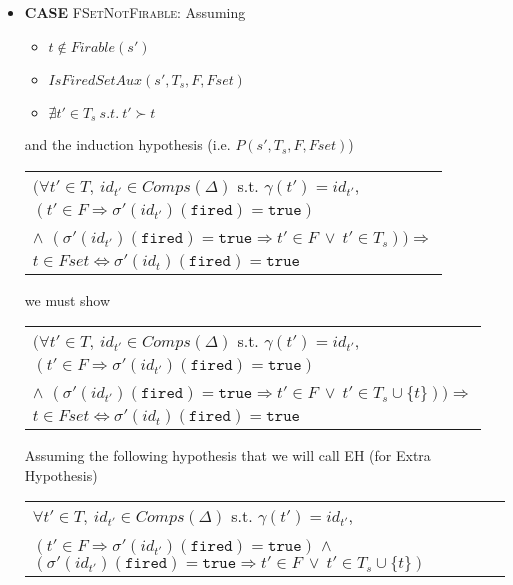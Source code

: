 \documentclass[dvipsnames,12pt]{article}
\begin{document}
\begin{niproof}
\begin{itemize}
  \item \textbf{CASE} \textsc{FSetNotFirable}:
    Assuming
    \begin{itemize}
    \item $t\notin{}Firable(s')$
    \item $IsFiredSetAux(s',T_s,F,Fset)$
    \item $\nexists{}t'\in{}T_s~s.t.~t'\succ{}t$
    \end{itemize}
    and the induction hypothesis (i.e. $P(s',T_s,F,Fset)$)
    \begin{ih}
      \begin{tabular}{l}
        $\big(\forall{}t'\in{}T,~id_{t'}\in{}Comps(\Delta)$
        s.t. $\gamma(t')=id_{t'}$,\\
        $(t'\in{}F\Rightarrow\sigma'(id_{t'})(\texttt{fired})=\mathtt{true})$\\
        $\land$
        $(\sigma'(id_{t'})(\texttt{fired})=\mathtt{true}\Rightarrow{}t'\in{}F~\lor~{}t'\in{}T_s)\big)\Rightarrow$ \\
        $t\in{}Fset\Leftrightarrow\sigma'(id_t)(\texttt{fired})=\mathtt{true}$
      \end{tabular}
    \end{ih}

    we must show

    \begin{frameb}
      \begin{tabular}{l}
        $\big(\forall{}t'\in{}T,~id_{t'}\in{}Comps(\Delta)$
        s.t. $\gamma(t')=id_{t'}$,\\
        $(t'\in{}F\Rightarrow\sigma'(id_{t'})(\texttt{fired})=\mathtt{true})$\\
        $\land$
        $(\sigma'(id_{t'})(\texttt{fired})=\mathtt{true}\Rightarrow{}t'\in{}F~\lor~{}t'\in{}T_s\cup\{t\})\big)\Rightarrow$ \\
        $t\in{}Fset\Leftrightarrow\sigma'(id_t)(\texttt{fired})=\mathtt{true}$
      \end{tabular}
    \end{frameb}

    Assuming the following hypothesis that we will call EH (for Extra
    Hypothesis)

    \begin{center}
      \begin{tabular}{l}
        $\forall{}t'\in{}T,~id_{t'}\in{}Comps(\Delta)$
        s.t. $\gamma(t')=id_{t'}$,\\
        $(t'\in{}F\Rightarrow\sigma'(id_{t'})(\texttt{fired})=\mathtt{true})$
        $\land$
        $(\sigma'(id_{t'})(\texttt{fired})=\mathtt{true}\Rightarrow{}t'\in{}F~\lor~{}t'\in{}T_s\cup\{t\})$ \\
      \end{tabular}
    \end{center}


\end{itemize}
\end{niproof}
\end{document}
